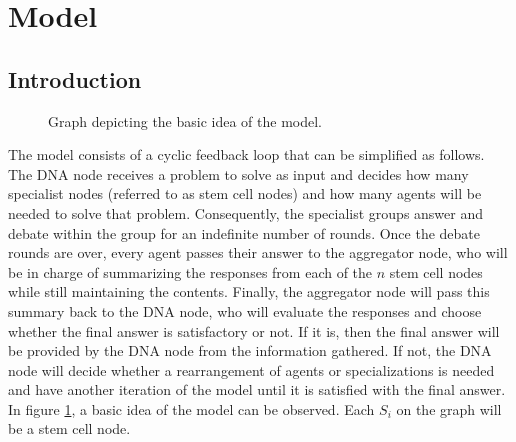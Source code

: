 \section{Model}
\label{sec:model}

\subsection{Introduction}

\begin{figure}[ht]
    \centering
    \caption{Graph depicting the basic idea of the model.}
    \label{fig:basicmodel}
\end{figure}

The model consists of a cyclic feedback loop that can be simplified as follows. The DNA node receives a problem to solve as input and decides how many specialist nodes (referred to as stem cell nodes) and how many agents will be needed to solve that problem. Consequently, the specialist groups answer and debate within the group for an indefinite number of rounds. Once the debate rounds are over, every agent passes their answer to the aggregator node, who will be in charge of summarizing the responses from each of the $n$ stem cell nodes while still maintaining the contents. Finally, the aggregator node will pass this summary back to the DNA node, who will evaluate the responses and choose whether the final answer is satisfactory or not. If it is, then the final answer will be provided by the DNA node from the information gathered. If not, the DNA node will decide whether a rearrangement of agents or specializations is needed and have another iteration of the model until it is satisfied with the final answer. In figure \ref{fig:basicmodel}, a basic idea of the model can be observed. Each $S_i$ on the graph will be a stem cell node.


